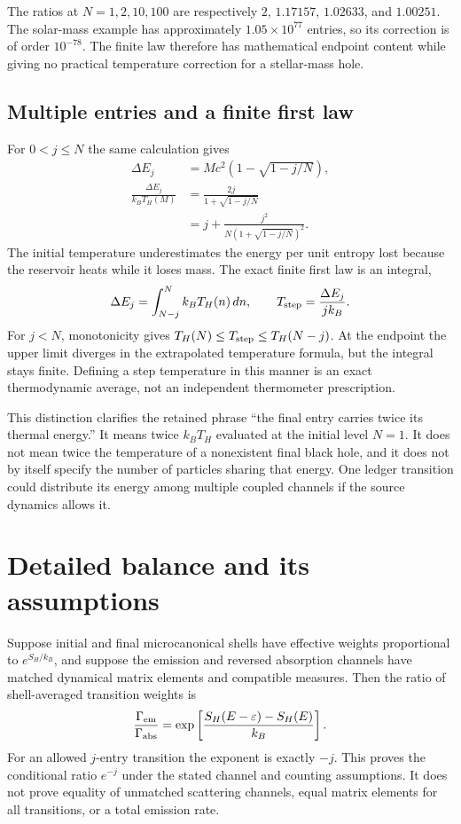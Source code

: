The ratios at $N=1,2,10,100$ are respectively $2$, $1.17157$, $1.02633$, and $1.00251$. The solar-mass example has approximately $1.05\times10^{77}$ entries, so its correction is of order $10^{-78}$. The finite law therefore has mathematical endpoint content while giving no practical temperature correction for a stellar-mass hole.

\subsection{Multiple entries and a finite first law}
For $0<j\le N$ the same calculation gives
\begin{equation}
 \begin{aligned}
 \Delta E_j&=Mc^2\left(1-\sqrt{1-j/N}\right),\\
 \frac{\Delta E_j}{k_BT_H(M)}
 &=\frac{2j}{1+\sqrt{1-j/N}}
\\&=j+\frac{j^2}{N(1+\sqrt{1-j/N})^2}.
 \end{aligned}
 \label{c7:jstep}
\end{equation}
The initial temperature underestimates the energy per unit entropy lost because the reservoir heats while it loses mass. The exact finite first law is an integral,
\begin{equation}
 \Delta E_j=\int_{N-j}^{N}k_BT_H(n)\,dn,
 \qquad T_{\rm step}=\frac{\Delta E_j}{jk_B}.
 \label{c7:step-temperature}
\end{equation}
For $j<N$, monotonicity gives $T_H(N)\le T_{\rm step}\le T_H(N-j)$. At the endpoint the upper limit diverges in the extrapolated temperature formula, but the integral stays finite. Defining a step temperature in this manner is an exact thermodynamic average, not an independent thermometer prescription.

This distinction clarifies the retained phrase ``the final entry carries twice its thermal energy.'' It means twice $k_BT_H$ evaluated at the initial level $N=1$. It does not mean twice the temperature of a nonexistent final black hole, and it does not by itself specify the number of particles sharing that energy. One ledger transition could distribute its energy among multiple coupled channels if the source dynamics allows it.

\section{Detailed balance and its assumptions}
Suppose initial and final microcanonical shells have effective weights proportional to $e^{S_H/k_B}$, and suppose the emission and reversed absorption channels have matched dynamical matrix elements and compatible measures. Then the ratio of shell-averaged transition weights is
\begin{equation}
 \frac{\Gamma_{\rm em}}{\Gamma_{\rm abs}}
 =\exp\left[\frac{S_H(E-\varepsilon)-S_H(E)}{k_B}\right].
 \label{c7:balance}
\end{equation}
For an allowed $j$-entry transition the exponent is exactly $-j$. This proves the conditional ratio $e^{-j}$ under the stated channel and counting assumptions. It does not prove equality of unmatched scattering channels, equal matrix elements for all transitions, or a total emission rate.


